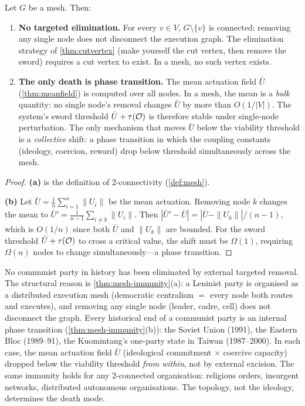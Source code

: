 \begin{theorem}\label{thm:mesh-immunity}
Let $G$ be a mesh.  Then:
\begin{enumerate}[label=(\alph*)]
  \item \textbf{No targeted elimination.}  For every $v \in V$,
    $G \setminus \{v\}$ is connected: removing any single node
    does not disconnect the execution graph.
    The elimination strategy of \cref{thm:cutvertex} (make
    yourself the cut vertex, then remove the sword) requires
    a cut vertex to exist.  In a mesh, no such vertex exists.
  \item \textbf{The only death is phase transition.}  The
    mean actuation field $\bar{U}$ (\cref{thm:meanfield}) is
    computed over all nodes.  In a mesh, the mean is a
    \emph{bulk} quantity: no single node's removal changes
    $\bar{U}$ by more than $O(1/|V|)$.  The system's sword
    threshold $\bar{U} + \tau(\mathcal{O})$ is therefore stable under
    single-node perturbation.  The only mechanism that moves
    $\bar{U}$ below the viability threshold is a
    \emph{collective} shift: a phase transition in which the
    coupling constants (ideology, coercion, reward) drop below
    threshold simultaneously across the mesh.
\end{enumerate}
\end{theorem}

\begin{proof}
\textbf{(a)} is the definition of $2$-connectivity
(\cref{def:mesh}).

\textbf{(b)}  Let $\bar{U} = \frac{1}{n}\sum_{i=1}^n \|U_i\|$
be the mean actuation.  Removing node $k$ changes the mean to
$\bar{U}' = \frac{1}{n-1}\sum_{i \neq k} \|U_i\|$.
Then $|\bar{U}' - \bar{U}| = |\bar{U} - \|U_k\||/(n-1)$, which
is $O(1/n)$ since both $\bar{U}$ and $\|U_k\|$ are bounded.  For the sword threshold
$\bar{U} + \tau(\mathcal{O})$ to cross a critical value, the shift must
be $\Omega(1)$, requiring $\Omega(n)$ nodes to change
simultaneously---a phase transition.
\end{proof}

\begin{remark}
\label{rem:mesh-history}
No communist party in history has been eliminated by external
targeted removal.  The structural reason is
\cref{thm:mesh-immunity}(a): a Leninist party is organised as a
distributed execution mesh (democratic centralism $=$ every node
both routes and executes), and removing any single node
(leader, cadre, cell) does not disconnect the graph.
Every historical end of a communist party is an internal phase
transition (\cref{thm:mesh-immunity}(b)): the Soviet Union
(1991), the Eastern Bloc (1989--91), the Kuomintang's
one-party state in Taiwan (1987--2000).  In each case, the
mean actuation field $\bar{U}$ (ideological commitment $\times$
coercive capacity) dropped below the viability threshold
\emph{from within}, not by external excision.
The same immunity holds for any $2$-connected organisation:
religious orders, insurgent networks, distributed autonomous
organisations.  The topology, not the ideology, determines
the death mode.
\end{remark}

